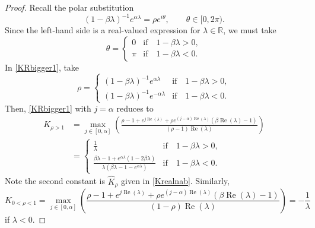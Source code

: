 \documentclass[12pt,reqno]{amsart}
\theoremstyle{plain}
\theoremstyle{definition}
\newcommand{\R}{\ensuremath{\mathbb{R}}}
\numberwithin{equation}{section}
\numberwithin{theorem}{section}
\begin{document}
\begin{proof}
Recall the polar substitution
\[ (1-\beta\lambda)^{-1}e^{\alpha\lambda} = \rho e^{i\theta}, \qquad \theta\in[0,2\pi). \]
Since the left-hand side is a real-valued expression for $\lambda\in\R$, we must take
\[ \theta = \begin{cases} 0 &\text{if}\quad 1-\beta\lambda>0, \\ \pi &\text{if}\quad 1-\beta\lambda<0. \end{cases} \]
In \eqref{KRbigger1}, take 
\[ \rho = \begin{cases} (1-\beta\lambda)^{-1}e^{\alpha\lambda} &\text{if}\quad 1-\beta\lambda>0, \\  (1-\beta\lambda)^{-1}e^{-\alpha\lambda} &\text{if}\quad 1-\beta\lambda<0. \end{cases} \]
Then, \eqref{KRbigger1} with $j=\alpha$ reduces to
\begin{align*} 
 K_{\rho>1} &=\max_{j\in[0,\alpha]}\left(\frac{\rho-1+e^{j\operatorname{Re}(\lambda)}+\rho e^{(j-\alpha)\operatorname{Re}(\lambda)}\left(\beta\operatorname{Re}(\lambda)-1\right)}{(\rho-1)\operatorname{Re}(\lambda)}\right) \\
 &= \begin{cases} \frac{1}{\lambda} &\text{if}\quad 1-\beta\lambda>0, \\ \frac{\beta\lambda-1+e^{\alpha\lambda}(1-2\beta\lambda)}{\lambda\left(\beta\lambda-1-e^{\alpha\lambda}\right)} &\text{if}\quad 1-\beta\lambda<0. \end{cases}
\end{align*}
Note the second constant is $\widehat{K}_{\rho}$ given in \eqref{Krealnab}. Similarly,
\[ K_{0<\rho<1} = \max_{j\in[0,\alpha]}\left(\frac{\rho-1+e^{j\operatorname{Re}(\lambda)}+\rho e^{(j-\alpha)\operatorname{Re}(\lambda)}\left(\beta\operatorname{Re}(\lambda)-1\right)}{(1-\rho)\operatorname{Re}(\lambda)}\right) = - \frac{1}{\lambda} \]
if $\lambda<0$. 
\end{proof}




\end{document}
